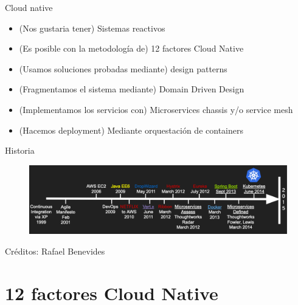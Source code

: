 \documentclass[aspectratio=169]{beamer}
\begin{document}
\begin{frame}{Cloud native}

	\begin{itemize}
		\item (Nos gustaria tener) Sistemas reactivos
		\item (Es posible con la metodología de) 12 factores Cloud Native
        \item (Usamos soluciones probadas mediante) design patterns
        \item (Fragmentamos el sistema mediante) Domain Driven Design
		\item (Implementamos los servicios con) Microservices chassis y/o service mesh
        \item (Hacemos deployment) Mediante orquestación de containers
	\end{itemize}


\end{frame}


\begin{frame}{Historia}

\begin{figure}
	\centering
	\includegraphics[width=\linewidth]{Images/timeline}
\end{figure}
Créditos: Rafael Benevides

\end{frame}



{
    \section{12 factores Cloud Native}
}
\end{document}
